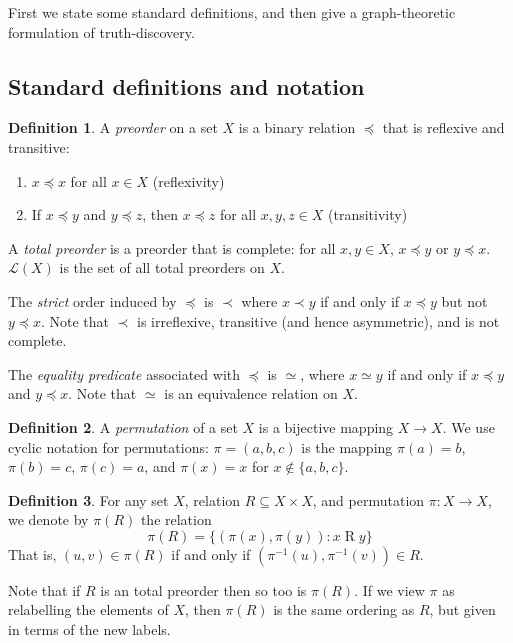 \documentclass{article}
\theoremstyle{definition} \newtheorem{definition}{Definition}
\theoremstyle{definition} \newtheorem{example}{Example}
\theoremstyle{plain} \newtheorem{axiom}{Axiom}
\theoremstyle{plain} \newtheorem*{remark}{Remark}
\theoremstyle{remark} \newtheorem*{notation}{Notation}
\theoremstyle{plain} \newtheorem{lemma}{Lemma}
\theoremstyle{plain} \newtheorem{theorem}{Theorem}
\theoremstyle{plain} \newtheorem{proposition}{Proposition}
\newcommand{\orderings}{\mathcal{L}}
\begin{document}
First we state some standard definitions, and then give a graph-theoretic
formulation of truth-discovery.

\subsection{Standard definitions and notation}

\begin{definition}
A \emph{preorder} on a set $X$ is a binary relation $\preceq$ that is reflexive
and transitive:
\begin{enumerate}
\item $x \preceq x$ for all $x \in X$ (reflexivity)
\item If $x \preceq y$ and $y \preceq z$, then $x \preceq z$ for all $x, y, z
\in X$ (transitivity)
\end{enumerate}

A \emph{total preorder} is a preorder that is complete: for all $x, y \in X$,
$x \preceq y$ or $y \preceq x$. $\orderings(X)$ is the set of all total
preorders on $X$.

The \emph{strict} order induced by $\preceq$ is $\prec$ where $x \prec y$ if
and only if $x \preceq y$ but not $y \preceq x$. Note that $\prec$ is
irreflexive, transitive (and hence asymmetric), and is not complete.

The \emph{equality predicate} associated with $\preceq$ is $\simeq$, where $x
\simeq y$ if and only if $x \preceq y$ and $y \preceq x$. Note that $\simeq$ is
an equivalence relation on $X$.

\end{definition}

\begin{definition}
A \emph{permutation} of a set $X$ is a bijective mapping $X \rightarrow X$. We
use cyclic notation for permutations: $\pi=(a, b, c)$ is the mapping $\pi(a) =
b$, $\pi(b) = c$, $\pi(c) = a$, and $\pi(x) = x$ for $x \notin \{a, b, c\}$.
\end{definition}

\begin{definition}
For any set $X$, relation $R \subseteq X \times X$, and permutation $\pi: X
\rightarrow X$, we denote by $\pi(R)$ the relation
$$ \pi(R) = \{(\pi(x), \pi(y)) : x \mathbin{R} y\} $$
That is, $(u, v) \in \pi(R)$ if and only if $(\pi^{-1}(u), \pi^{-1}(v)) \in R$.
\end{definition}

Note that if $R$ is an total preorder then so too is $\pi(R)$. If we view $\pi$
as relabelling the elements of $X$, then $\pi(R)$ is the same ordering as $R$,
but given in terms of the new labels.
\end{document}
